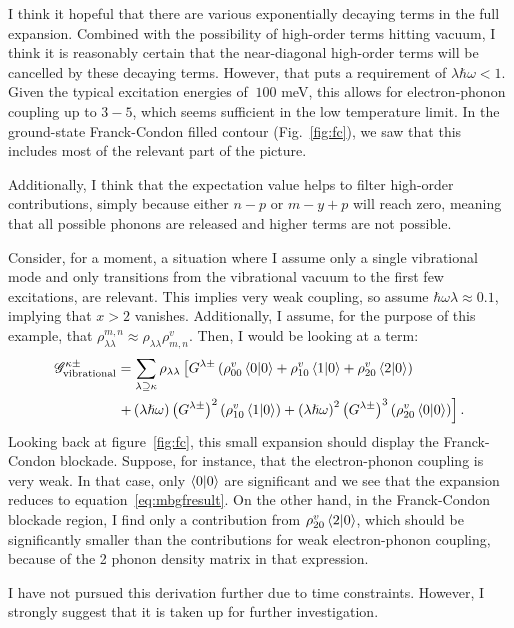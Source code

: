 I think it hopeful that there are various exponentially decaying terms in the full expansion. Combined with the possibility of high-order terms hitting vacuum, I think it is reasonably certain that the near-diagonal high-order terms will be cancelled by these decaying terms. However, that puts a requirement of $ \lambda \hbar \omega < 1$. Given the typical excitation energies of $~100$ meV, this allows for electron-phonon coupling up to $3-5$, which seems sufficient in the low temperature limit. In the ground-state Franck-Condon filled contour (Fig.~\ref{fig:fc}), we saw that this includes most of the relevant part of the picture.

Additionally, I think that the expectation value helps to filter high-order contributions, simply because either $n-p$ or $m-y+p$ will reach zero, meaning that all possible phonons are released and higher terms are not possible. 

Consider, for a moment, a situation where I assume only a single vibrational mode and only transitions from the vibrational vacuum to the first few excitations, are relevant. This implies very weak coupling, so assume $\hbar \omega \lambda \approx 0.1$, implying that $x>2$ vanishes. Additionally, I assume, for the purpose of this example, that $\rho^{m,n}_{\lambda\lambda} \approx \rho_{\lambda\lambda} \rho^v_{m,n}$. Then, I would be looking at a term:
\begin{align*}
\mathscr{G}^{\kappa\pm}_\text{vibrational} &= \sum_{\lambda\supseteq \kappa} \rho_{\lambda \lambda} \left[ G^{\lambda\pm} \left( \rho_{00}^v \braket{0|0} + \rho_{10}^v \braket{1|0} + \rho_{20}^v\braket{2|0}\right) \right. \\ &\left.+ \left(\lambda\hslash\omega\right)\left(G^{\lambda\pm}\right)^2 \left(\rho_{10}^v \braket{1|0}\right) + \left(\lambda\hslash\omega\right)^2 \left(G^{\lambda\pm}\right)^3 \left( \rho_{20}^v \braket{0|0}\right) \right].
\end{align*}
Looking back at figure~\ref{fig:fc}, this small expansion should display the Franck-Condon blockade. Suppose, for instance, that the electron-phonon coupling is very weak. In that case, only $\braket{0|0}$ are significant and we see that the expansion reduces to equation~\ref{eq:mbgfresult}. On the other hand, in the Franck-Condon blockade region, I find only a contribution from $\rho^v_{20} \braket{2|0}$, which should be significantly smaller than the contributions for weak electron-phonon coupling, because of the 2 phonon density matrix in that expression.

I have not pursued this derivation further due to time constraints. However, I strong\-ly suggest that it is taken up for further investigation.



\clearpage
{}